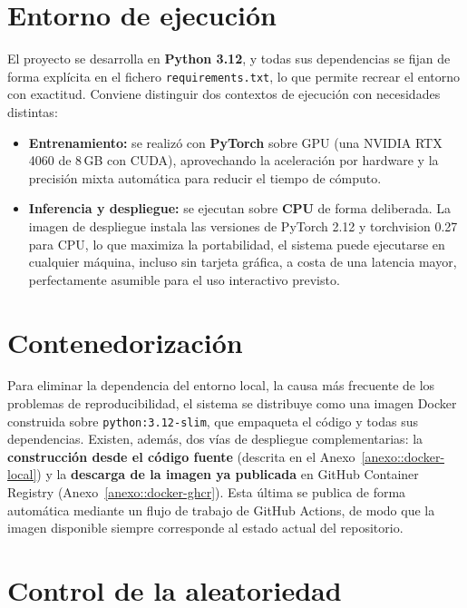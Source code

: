 \section{Entorno de ejecución}
\label{sec::repro_entorno}

El proyecto se desarrolla en \textbf{Python 3.12}, y todas sus dependencias se fijan de
forma explícita en el fichero \texttt{requirements.txt}, lo que permite recrear el
entorno con exactitud. Conviene distinguir dos contextos de ejecución con necesidades
distintas:

\begin{itemize}
  \item \textbf{Entrenamiento:} se realizó con \textbf{PyTorch} sobre GPU (una NVIDIA
        RTX 4060 de 8\,GB con CUDA), aprovechando la aceleración por hardware y la
        precisión mixta automática para reducir el tiempo de cómputo.
  \item \textbf{Inferencia y despliegue:} se ejecutan sobre \textbf{CPU} de forma
        deliberada. La imagen de despliegue instala las versiones de PyTorch 2.12 y
        torchvision 0.27 para CPU, lo que maximiza la portabilidad, el sistema puede
        ejecutarse en cualquier máquina, incluso sin tarjeta gráfica, a costa de una
        latencia mayor, perfectamente asumible para el uso interactivo previsto.
\end{itemize}

\section{Contenedorización}
\label{sec::repro_docker}

Para eliminar la dependencia del entorno local, la causa más frecuente de los problemas
de reproducibilidad, el sistema se distribuye como una imagen Docker construida sobre
\texttt{python:3.12-slim}, que empaqueta el código y todas sus dependencias. Existen,
además, dos vías de despliegue complementarias: la \textbf{construcción desde el código
fuente} (descrita en el Anexo~\ref{anexo::docker-local}) y la \textbf{descarga de la
imagen ya publicada} en GitHub Container Registry (Anexo~\ref{anexo::docker-ghcr}). Esta
última se publica de forma automática mediante un flujo de trabajo de GitHub Actions, de
modo que la imagen disponible siempre corresponde al estado actual del repositorio.

\section{Control de la aleatoriedad}
\label{sec::repro_semilla}

